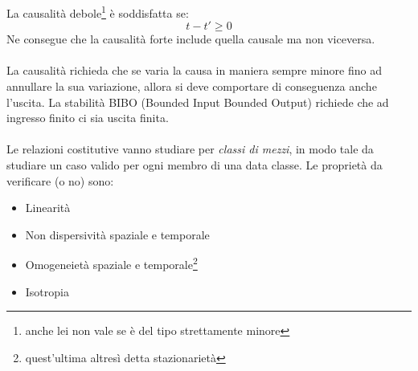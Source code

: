 \documentclass{book}
\begin{document}
            La causalità debole\footnote{anche lei non vale se è del tipo strettamente minore} è soddisfatta se:
            \begin{equation}
                t-t' \geq 0
            \end{equation}
            Ne consegue che la causalità forte include quella causale ma non viceversa. \\ \\
            La causalità richieda che se varia la causa in maniera sempre minore fino ad annullare la sua variazione, allora si deve comportare di conseguenza anche l'uscita. La stabilità BIBO (Bounded Input Bounded Output) richiede che ad ingresso finito ci sia uscita finita. \\ \\
            Le relazioni costitutive vanno studiare per \textit{classi di mezzi}, in modo tale da studiare un caso valido per ogni membro di una data classe. Le proprietà da verificare (o no) sono:
            \begin{itemize}
                \item Linearità
                \item Non dispersività spaziale e temporale
                \item Omogeneietà spaziale e temporale\footnote{quest'ultima altresì detta stazionarietà}
                \item Isotropia
            \end{itemize}
\end{document}
